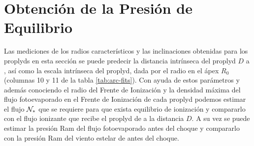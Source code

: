 \section{Obtención de la Presión de Equilibrio}

Las mediciones de los radios característicos y las inclinaciones obtenidas para los proplyds en esta sección se puede predecir la distancia intrínseca del proplyd $D$ a \thC{}, así como la escala intrínseca del proplyd, dada por el radio en el ápex $R_0$ (columnas 10 y 11 de la tabla \ref{tab:arc-fits}). Con ayuda de estos parámetros y además conociendo el radio del Frente de Ionización y la densidad máxima del flujo fotoevaporado en el Frente de Ionización de cada proplyd podemos estimar el flujo $\mathcal{N}_*$ que se requiere para que exista equilibrio de ionización y compararlo con el flujo ionizante que recibe el proplyd de \thC{} a la distancia $D$. A su vez se puede estimar la presión Ram del flujo fotoevaporado antes del choque y compararlo con la presión Ram del viento estelar de \thC{} antes del choque. 




